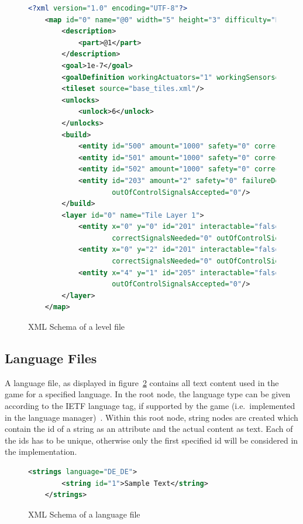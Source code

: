 \begin{figure}
\begin{lstlisting}[language=XML,label={lst:level-xml}]
    <?xml version="1.0" encoding="UTF-8"?>
    <map id="0" name="@0" width="5" height="3" difficulty="EASY">
        <description>
            <part>@1</part>
        </description>
        <goal>1e-7</goal>
        <goalDefinition workingActuators="1" workingSensors="0" workingComputers="0"/>
        <tileset source="base_tiles.xml"/>
        <unlocks>
            <unlock>6</unlock>
        </unlocks>
        <build>
            <entity id="500" amount="1000" safety="0" correctSignalsNeeded="1" outOfControlSignalsAccepted="0"/>
            <entity id="501" amount="1000" safety="0" correctSignalsNeeded="1" outOfControlSignalsAccepted="0"/>
            <entity id="502" amount="1000" safety="0" correctSignalsNeeded="1" outOfControlSignalsAccepted="0"/>
            <entity id="203" amount="2" safety="0" failureDetectionRatio="1" correctSignalsNeeded="1"
                    outOfControlSignalsAccepted="0"/>
        </build>
        <layer id="0" name="Tile Layer 1">
            <entity x="0" y="0" id="201" interactable="false" safety="1e-4" failureDetectionRatio="1"
                    correctSignalsNeeded="0" outOfControlSignalsAccepted="0"/>
            <entity x="0" y="2" id="201" interactable="false" safety="1e-4" failureDetectionRatio="1"
                    correctSignalsNeeded="0" outOfControlSignalsAccepted="0"/>
            <entity x="4" y="1" id="205" interactable="false" safety="0" failureDetectionRatio="1" correctSignalsNeeded="2"
                    outOfControlSignalsAccepted="0"/>
        </layer>
    </map>
\end{lstlisting}
    \caption{\gls{XML} Schema of a level file}
    \label{fig:xml-level}
\end{figure}
\subsection{Language Files}\label{subsec:language-files}
A language file, as displayed in figure~\ref{fig:xml-lang} contains all text content used in the game for a specified language.
In the root node, the language type can be given according to the \gls{IETF} language tag, if supported by the
game (i.e.\ implemented in the language manager)~\cite{IETF}.
Within this root node, string nodes are created which contain the id of a string as an attribute and the actual content as text.
Each of the ids has to be unique, otherwise only the first specified id will be considered in the implementation.
\\
\begin{figure}
\begin{lstlisting}[language=XML,label={lst:lang-xml}]
    <strings language="DE_DE">
        <string id="1">Sample Text</string>
    </strings>
\end{lstlisting}
    \caption{\gls{XML} Schema of a language file}
    \label{fig:xml-lang}
\end{figure}

